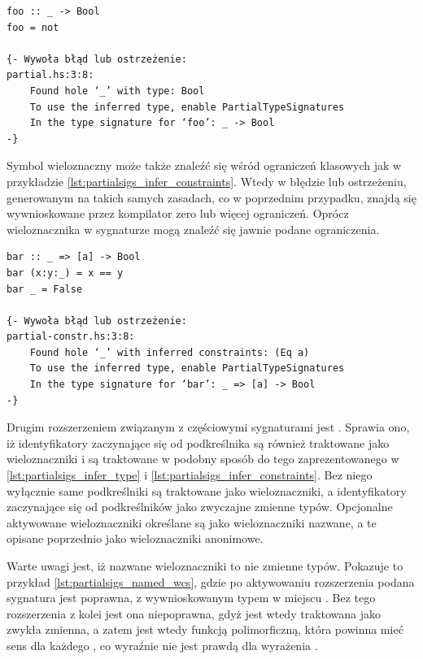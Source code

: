 {\begin{lstlisting}[float,label={lst:partialsigs_infer_type},
                   caption={Przykład użycia anonimowego symbolu wieloznacznego w sygnaturze typu.}]
foo :: _ -> Bool
foo = not

{- Wywoła błąd lub ostrzeżenie:
partial.hs:3:8:
    Found hole ‘_’ with type: Bool
    To use the inferred type, enable PartialTypeSignatures
    In the type signature for ‘foo’: _ -> Bool
-}
\end{lstlisting}

Symbol wieloznaczny może także znaleźć się wśród ograniczeń klasowych jak w przykładzie \ref{lst:partialsigs_infer_constraints}. Wtedy w błędzie lub ostrzeżeniu, generowanym na takich samych zasadach, co w poprzednim przypadku, znajdą się wywnioskowane przez kompilator zero lub więcej ograniczeń. Oprócz wieloznacznika w sygnaturze mogą znaleźć się jawnie podane ograniczenia.

\begin{lstlisting}[float,label={lst:partialsigs_infer_constraints},
                   caption={Przykład użycia anonimowego symbolu wieloznacznego w ograniczeniach typu.}]
bar :: _ => [a] -> Bool
bar (x:y:_) = x == y
bar _ = False

{- Wywoła błąd lub ostrzeżenie:
partial-constr.hs:3:8:
    Found hole ‘_’ with inferred constraints: (Eq a)
    To use the inferred type, enable PartialTypeSignatures
    In the type signature for ‘bar’: _ => [a] -> Bool
-}
\end{lstlisting}

Drugim rozszerzeniem związanym z częściowymi sygnaturami jest . Sprawia ono, iż identyfikatory zaczynające się od podkreślnika są również traktowane jako wieloznaczniki i są traktowane w podobny sposób do tego zaprezentowanego w \ref{lst:partialsigs_infer_type} i \ref{lst:partialsigs_infer_constraints}. Bez niego wyłącznie same podkreślniki są traktowane jako wieloznaczniki, a identyfikatory zaczynające się od podkreślników jako zwyczajne zmienne typów. Opcjonalne aktywowane wieloznaczniki określane są jako wieloznaczniki nazwane, a te opisane poprzednio jako wieloznaczniki anonimowe.

Warte uwagi jest, iż nazwane wieloznaczniki to nie zmienne typów. Pokazuje to przykład \ref{lst:partialsigs_named_wcs}, gdzie po aktywowaniu rozszerzenia  podana sygnatura jest poprawna, z wywnioskowanym typem  w miejscu . Bez tego rozszerzenia z kolei jest ona niepoprawna, gdyż  jest wtedy traktowana jako zwykła zmienna, a zatem  jest wtedy funkcją polimorficzną, która powinna mieć sens dla każdego , co wyraźnie nie jest prawdą dla wyrażenia \cite{GuidePartialTypeSignatures}.

}
